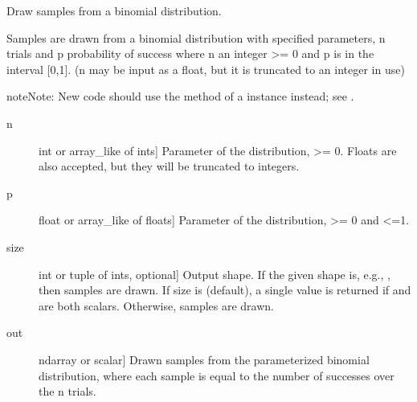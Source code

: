 \documentclass[letterpaper,10pt,english]{sphinxmanual}
\begin{document}

\begin{fulllineitems}
\label{\detokenize{infrapy.utils:infrapy.utils.ref2sac.binomial}}
Draw samples from a binomial distribution.

Samples are drawn from a binomial distribution with specified
parameters, n trials and p probability of success where
n an integer \textgreater{}= 0 and p is in the interval {[}0,1{]}. (n may be
input as a float, but it is truncated to an integer in use)

\begin{sphinxadmonition}{note}{Note:}
New code should use the  method of a 
instance instead; see .
\end{sphinxadmonition}
\begin{description}
\item[{n}] \leavevmode{[}int or array\_like of ints{]}
Parameter of the distribution, \textgreater{}= 0. Floats are also accepted,
but they will be truncated to integers.

\item[{p}] \leavevmode{[}float or array\_like of floats{]}
Parameter of the distribution, \textgreater{}= 0 and \textless{}=1.

\item[{size}] \leavevmode{[}int or tuple of ints, optional{]}
Output shape.  If the given shape is, e.g., , then
 samples are drawn.  If size is  (default),
a single value is returned if  and  are both scalars.
Otherwise,  samples are drawn.

\end{description}
\begin{description}
\item[{out}] \leavevmode{[}ndarray or scalar{]}
Drawn samples from the parameterized binomial distribution, where
each sample is equal to the number of successes over the n trials.


\end{description}
\end{fulllineitems}
\end{document}
